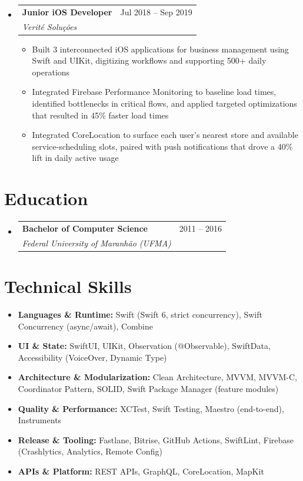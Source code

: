 \documentclass[11pt,letterpaper]{article}
\makeatletter
\newcommand{\resumeSubheading}[4]{
  \item
    \begin{tabular*}{\linewidth}{l@{\extracolsep{\fill}}r}
      \textbf{#1} & #2 \\
      \textit{#3} & \textit{#4} \\
    \end{tabular*}
}
\newcommand{\resumeItem}[1]{
  \item{#1}
}
\makeatother
\begin{document}
\begin{itemize}[leftmargin=0.15in]
    \resumeSubheading
        {Junior iOS Developer}{Jul 2018 -- Sep 2019}
        {Verité Soluções}{}
        \begin{itemize}
            \resumeItem{Built 3 interconnected iOS applications for business management using Swift and UIKit, digitizing workflows and supporting 500+ daily operations}
            \resumeItem{Integrated Firebase Performance Monitoring to baseline load times, identified bottlenecks in critical flows, and applied targeted optimizations that resulted in 45\% faster load times}
            \resumeItem{Integrated CoreLocation to surface each user's nearest store and available service-scheduling slots, paired with push notifications that drove a 40\% lift in daily active usage}
        \end{itemize}
\end{itemize}

\section*{Education}

\begin{itemize}[leftmargin=0.15in]
    \resumeSubheading
        {Bachelor of Computer Science}{2011 -- 2016}
        {Federal University of Maranhão (UFMA)}{}
        
\end{itemize}

\section*{Technical Skills}

\begin{itemize}[leftmargin=0.15in]
    \item \textbf{Languages \& Runtime:} Swift (Swift 6, strict concurrency), Swift Concurrency (async/await), Combine
    \item \textbf{UI \& State:} SwiftUI, UIKit, Observation (@Observable), SwiftData, Accessibility (VoiceOver, Dynamic Type)
    \item \textbf{Architecture \& Modularization:} Clean Architecture, MVVM, MVVM-C, Coordinator Pattern, SOLID, Swift Package Manager (feature modules)
    \item \textbf{Quality \& Performance:} XCTest, Swift Testing, Maestro (end-to-end), Instruments
    \item \textbf{Release \& Tooling:} Fastlane, Bitrise, GitHub Actions, SwiftLint, Firebase (Crashlytics, Analytics, Remote Config)
    \item \textbf{APIs \& Platform:} REST APIs, GraphQL, CoreLocation, MapKit
\end{itemize}
\end{document}
